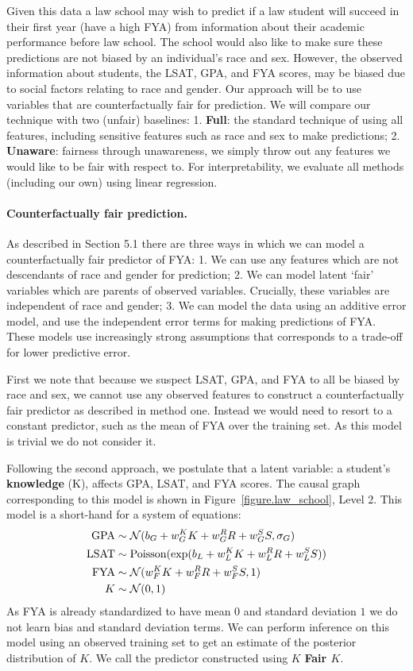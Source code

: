 Given this data a law school may wish to predict if a law student
will succeed in their first year (have a high FYA) from information about their academic performance 
before law school. The school would also like to make sure
these predictions are not biased by an individual's race and
sex. However, the observed information about
students, the LSAT, GPA, and FYA scores,  may be biased due to 
social factors relating to race and gender. Our approach will be to use variables that are counterfactually fair for prediction. We will compare our technique with two (unfair) baselines: 1. \textbf{Full}: the standard technique of using all features, including sensitive features such as race and sex to make predictions; 2. \textbf{Unaware}: fairness through unawareness, we simply throw out any features we would like to be fair with respect to. For interpretability, we evaluate all methods (including our own) using linear regression.

\paragraph{Counterfactually fair prediction.}
As described in Section 5.1 there are three ways in which we can model a counterfactually fair predictor of FYA: 1. We can use any features which are not descendants of race and gender for prediction; 2. We can model latent `fair' variables which are parents of observed variables. Crucially, these variables are independent of race and gender; 3. We can model the data using an additive error model, and use the independent error terms for making predictions of FYA. These models use increasingly strong assumptions that corresponds to a trade-off for lower predictive error.

First we note that because we suspect LSAT, GPA, and FYA to all be biased by race and sex, we cannot use any observed features to construct a counterfactually fair predictor as described in method one. Instead we would need to resort to a constant predictor, such as the mean of FYA over the training set. As this model is trivial we do not consider it. 

Following the second approach, we postulate that a latent variable: a student's \textbf{knowledge} (K), affects GPA, LSAT, and FYA scores. The causal graph corresponding to this model is shown in Figure~\ref{figure.law_school}, Level 2. This model is a short-hand for a system of equations:
\begin{align}
\mbox{GPA} &\sim {\cal N}(b_{G} + w_{G}^K K + w_{G}^R R + w_{G}^S S, \sigma_{G}) \nonumber \\
\mbox{LSAT} &\sim \textrm{Poisson}(\exp(b_{L} + w_{L}^K K + w_{L}^R R + w_{L}^S S)) \nonumber \\
\mbox{FYA} &\sim {\cal N}(w_{F}^K K + w_{F}^R R + w_{F}^S S, 1) \nonumber \\
K &\sim {\cal N}(0,1) \nonumber
\end{align}
As FYA is already standardized to have mean $0$ and standard deviation $1$ we do not learn bias and standard deviation terms. We can perform inference on this model using an observed training set to get an estimate of the posterior distribution of $K$. We call the predictor constructed using $K$ \textbf{Fair $K$}.

